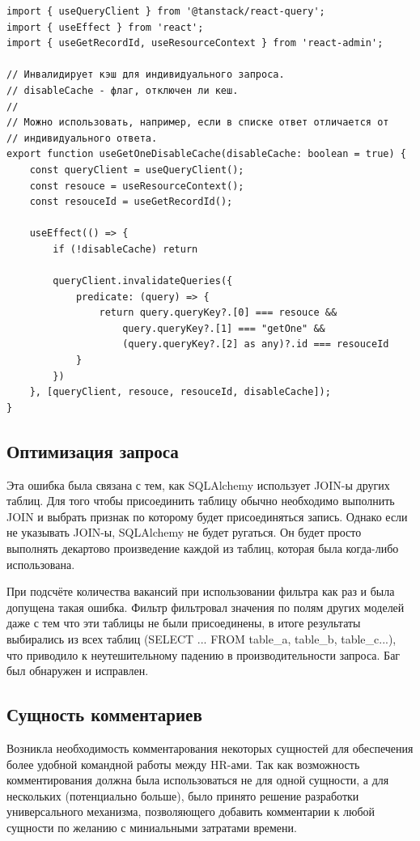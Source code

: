 \documentclass[a4paper,14pt]{extarticle}
\begin{document}
\begin{verbatim}
import { useQueryClient } from '@tanstack/react-query';
import { useEffect } from 'react';
import { useGetRecordId, useResourceContext } from 'react-admin';

// Инвалидирует кэш для индивидуального запроса.
// disableCache - флаг, отключен ли кеш.
//
// Можно использовать, например, если в списке ответ отличается от 
// индивидуального ответа. 
export function useGetOneDisableCache(disableCache: boolean = true) {
    const queryClient = useQueryClient();
    const resouce = useResourceContext();
    const resouceId = useGetRecordId();

    useEffect(() => {
        if (!disableCache) return

        queryClient.invalidateQueries({
            predicate: (query) => {
                return query.queryKey?.[0] === resouce &&
                    query.queryKey?.[1] === "getOne" &&
                    (query.queryKey?.[2] as any)?.id === resouceId
            }
        })
    }, [queryClient, resouce, resouceId, disableCache]);
}
\end{verbatim}

\subsection{Оптимизация запроса}
Эта ошибка была связана с тем, как SQLAlchemy использует JOIN-ы других таблиц. 
Для того чтобы присоединить таблицу обычно необходимо выполнить JOIN и выбрать признак по которому
будет присоединяться запись. Однако если не указывать JOIN-ы, SQLAlchemy не будет ругаться. Он будет просто 
выполнять декартово произведение каждой из таблиц, которая была когда-либо использована. 

При подсчёте количества вакансий при использовании фильтра как раз и была допущена такая ошибка. Фильтр 
фильтровал значения по полям других моделей даже с тем что эти таблицы не были присоединены, в итоге 
результаты выбирались из всех таблиц (SELECT ... FROM table\_a, table\_b, table\_c...), что приводило 
к неутешительному падению в производительности запроса. Баг был обнаружен и исправлен.

\subsection{Сущность комментариев}
Возникла необходимость комментарования некоторых сущностей для обеспечения более удобной 
командной работы между HR-ами. Так как возможность комментирования должна была 
использоваться не для одной сущности, а для нескольких (потенциально больше), было принято
решение разработки универсального механизма, позволяющего добавить комментарии к любой 
сущности по желанию с миниальными затратами времени.
\end{document}
